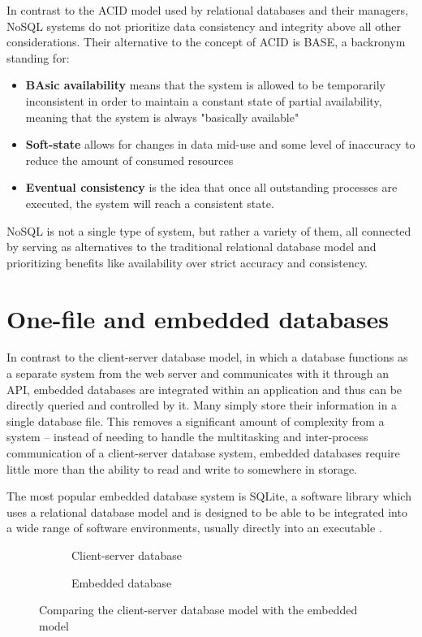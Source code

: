 In contrast to the ACID model used by relational databases and their managers, NoSQL systems do not prioritize data consistency and integrity above all other considerations. Their alternative to the concept of ACID is BASE, a backronym standing for:

\begin{itemize}
	\item \textbf{BAsic availability} means that the system is allowed to be temporarily inconsistent in order to maintain a constant state of partial availability, meaning that the system is always "basically available"
	\item \textbf{Soft-state} allows for changes in data mid-use and some level of inaccuracy to reduce the amount of consumed resources
	\item \textbf{Eventual consistency} is the idea that once all outstanding processes are executed, the system will reach a consistent state.
\end{itemize}

NoSQL is not a single type of system, but rather a variety of them, all connected by serving as alternatives to the traditional relational database model and prioritizing benefits like availability over strict accuracy and consistency.

\section{One-file and embedded databases}\label{onefile}

In contrast to the client-server database model, in which a database functions as a separate system from the web server and communicates with it through an API, embedded databases are integrated within an application and thus can be directly queried and controlled by it. Many simply store their information in a single database file. This removes a significant amount of complexity from a system -- instead of needing to handle the multitasking and inter-process communication of a client-server database system, embedded databases require little more than the ability to read and write to somewhere in storage.

The most popular embedded database system is SQLite, a software library which uses a relational database model and is designed to be able to be integrated into a wide range of software environments, usually directly into an executable \cite{kreibich_using_2010}.

\begin{figure}[!ht]
\centering
\begin{subfigure}[b]{0.4\textwidth}
	\centering
	\caption[Example of a client-server database]{Client-server database}\label{c-s}
\end{subfigure}
\qquad
\begin{subfigure}[b]{0.4\textwidth}
	\centering
	\caption[Example of an embedded database]{Embedded database}\label{emb}
\end{subfigure}
\caption{Comparing the client-server database model with the embedded model}\label{embVc-s}
\end{figure}

